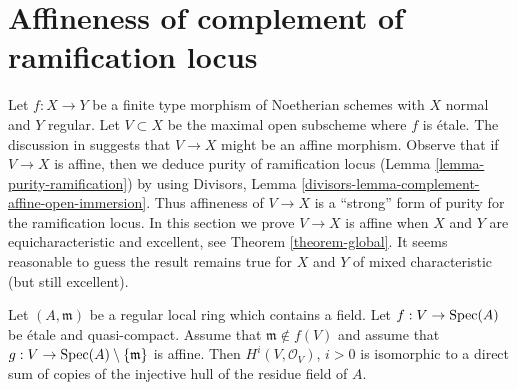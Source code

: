 \section{Affineness of complement of ramification locus}
\label{section-stronger-purity}

\noindent
Let $f : X \to Y$ be a finite type morphism of Noetherian schemes
with $X$ normal and $Y$ regular. Let $V \subset X$ be the maximal
open subscheme where $f$ is \'etale.
The discussion in \cite[Chapter IV, Section 21.12]{EGA}
suggests that $V \to X$ might be an affine morphism.
Observe that if $V \to X$ is affine, then we deduce purity of
ramification locus (Lemma \ref{lemma-purity-ramification}) by
using Divisors, Lemma \ref{divisors-lemma-complement-affine-open-immersion}.
Thus affineness of $V \to X$ is a ``strong'' form of purity
for the ramification locus.
In this section we prove $V \to X$ is affine when
$X$ and $Y$ are equicharacteristic and excellent, see
Theorem \ref{theorem-global}. It seems reasonable
to guess the result remains true for $X$ and $Y$
of mixed characteristic (but still excellent).

\begin{lemma}
\label{lemma-structure-cohomology}
Let $(A, \mathfrak m)$ be a regular local ring which contains a field.
Let $f : V \to \mathop{\mathrm{Spec}}(A)$ be \'etale and quasi-compact.
Assume that $\mathfrak m \not \in f(V)$ and assume that
$g : V \to \mathop{\mathrm{Spec}}(A) \setminus \{\mathfrak m\}$ is affine.
Then $H^i(V, \mathcal{O}_V)$, $i > 0$ is isomorphic to a direct
sum of copies of the injective hull of the residue field of $A$.
\end{lemma}

